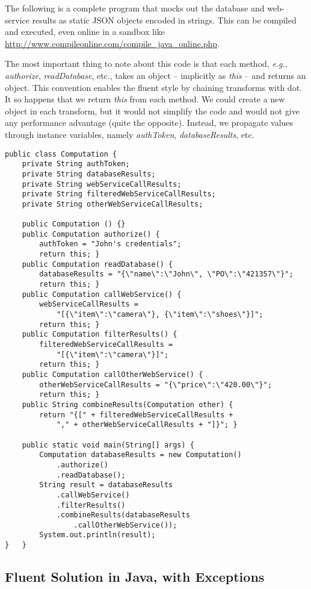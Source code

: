 \documentclass[11pt]{article}
\begin{document}
The following is a complete program that mocks out the database and
web-service results as static JSON objects encoded in strings. This
can be compiled and executed, even online in a sandbox like
\url{http://www.compileonline.com/compile_java_online.php}.

The most important thing to note about this code is that each
method, \emph{e.g.}, \emph{authorize}, \emph{readDatabase}, etc., takes an object
-- implicitly as \emph{this} -- and returns an object. This convention
enables the fluent style by chaining transforms with dot. It so
happens that we return \emph{this} from each method. We could create a
new object in each transform, but it would not simplify the code and
would not give any performance advantage (quite the opposite).
Instead, we propagate values through instance variables, namely
\emph{authToken}, \emph{databaseResults}, etc. 
\begin{verbatim}
public class Computation {
    private String authToken;
    private String databaseResults;
    private String webServiceCallResults;
    private String filteredWebServiceCallResults;
    private String otherWebServiceCallResults;

    public Computation () {}
    public Computation authorize() {
        authToken = "John's credentials";
        return this; }
    public Computation readDatabase() {
        databaseResults = "{\"name\":\"John\", \"PO\":\"421357\"}";
        return this; }
    public Computation callWebService() {
        webServiceCallResults =
            "[{\"item\":\"camera\"}, {\"item\":\"shoes\"}]";
        return this; }
    public Computation filterResults() {
        filteredWebServiceCallResults =
            "[{\"item\":\"camera\"}]";
        return this; }
    public Computation callOtherWebService() {
        otherWebServiceCallResults = "{\"price\":\"420.00\"}";
        return this; }
    public String combineResults(Computation other) {
        return "{[" + filteredWebServiceCallResults +
            "," + otherWebServiceCallResults + "]}"; }

    public static void main(String[] args) {
        Computation databaseResults = new Computation()
            .authorize()
            .readDatabase();
        String result = databaseResults
            .callWebService()
            .filterResults()
            .combineResults(databaseResults
                .callOtherWebService());
        System.out.println(result);
}   }
\end{verbatim}
\subsection{Fluent Solution in Java, with Exceptions}
\label{sec-2-2}
\end{document}
